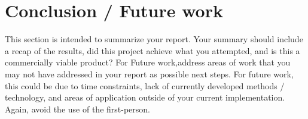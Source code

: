 \documentclass[10pt,journal,compsoc]{IEEEtran}
\begin{document}
\section{Conclusion / Future work}
This section is intended to summarize your report. Your summary should include a recap of the results, did this project achieve what you attempted, and is this a commercially viable product? 
For Future work,address areas of work that you may not have addressed in your report as possible next steps. For future work, this could be due to time constraints, lack of currently developed methods / technology, and areas of application outside of your current implementation. Again, avoid the use of the first-person.



\end{document}
